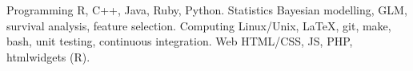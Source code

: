 


\begin{cvskills}

\cvskill
{Programming} %
{R, C++, Java, Ruby, Python.} %
\cvskill
{Statistics} %
{Bayesian modelling, GLM, survival analysis, feature selection.} %
\cvskill
{Computing} %
{Linux/Unix, \LaTeX{}, git, make, bash, unit testing, continuous integration.} %
\cvskill
{Web} %
{HTML/CSS, JS, PHP, htmlwidgets (R).} %

\end{cvskills}
